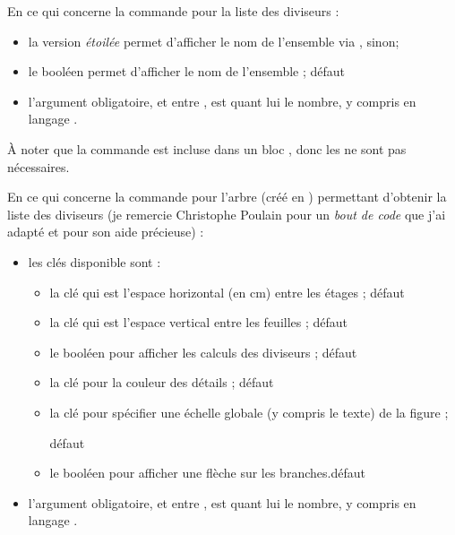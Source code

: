 \begin{cautionblock}
En ce qui concerne la commande pour la liste des diviseurs :

\begin{itemize}
\item la version \textit{étoilée} permet d'afficher le nom de l'ensemble via ,  sinon;
\item le booléen  permet d'afficher le nom de l'ensemble ; \hfill{}défaut 
\item l'argument obligatoire, et entre , est quant lui le nombre, y compris en langage .
\end{itemize}

À noter que la commande est incluse dans un bloc , donc les  ne sont pas nécessaires.
\end{cautionblock}

\begin{PresCodePL}{}


\end{PresCodePL}

\begin{cautionblock}
En ce qui concerne la commande pour l'arbre (créé en \TikZ) permettant d'obtenir la liste des diviseurs (je remercie Christophe Poulain pour un \textit{bout de code} que j'ai adapté et pour son aide précieuse) :

\begin{itemize}
\item les clés disponible sont :
\begin{itemize}
	\item la clé  qui est l'espace horizontal (en cm) entre les étages ; \hfill{}défaut 
	\item la clé  qui est l'espace vertical entre les feuilles ; \hfill{}défaut 
	\item le booléen  pour afficher les calculs des diviseurs ; \hfill{}défaut 
	\item la clé  pour la couleur des détails ; \hfill{}défaut 
	\item la clé  pour spécifier une échelle globale (y compris le texte) de la figure ;
	
	\hfill{}défaut 
	\item le booléen  pour afficher une flèche sur les branches.\hfill{}défaut 
\end{itemize}
\item l'argument obligatoire, et entre , est quant lui le nombre, y compris en langage .
\end{itemize}
\vspace*{-\baselineskip}\leavevmode
\end{cautionblock}

